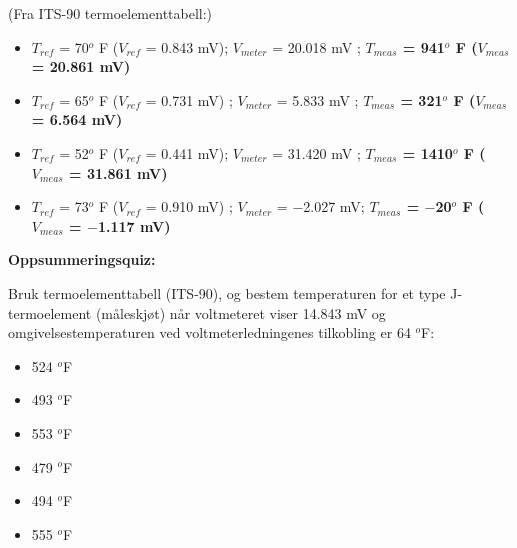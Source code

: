 
(Fra ITS-90 termoelementtabell:)

\begin{itemize}
\item{} $T_{ref}$ = 70$^{o}$ F ($V_{ref}$ = 0.843 mV); $V_{meter}$ = 20.018 mV ; {\bf $T_{meas}$ = 941$^{o}$ F ($V_{meas}$ = 20.861 mV)}
\item{} $T_{ref}$ = 65$^{o}$ F ($V_{ref}$ = 0.731 mV) ; $V_{meter}$ = 5.833 mV ; {\bf $T_{meas}$ = 321$^{o}$ F ($V_{meas}$ = 6.564 mV)}
\item{} $T_{ref}$ = 52$^{o}$ F ($V_{ref}$ = 0.441 mV); $V_{meter}$ = 31.420 mV ; {\bf $T_{meas}$ = 1410$^{o}$ F ($V_{meas}$ = 31.861 mV)}
\item{} $T_{ref}$ = 73$^{o}$ F ($V_{ref}$ = 0.910 mV) ; $V_{meter}$ = $-$2.027 mV; {\bf $T_{meas}$ = $-$20$^{o}$ F ($V_{meas}$ = $-$1.117 mV)}
\end{itemize}




\vfil \eject

\noindent
{\bf Oppsummeringsquiz:}

Bruk termoelementtabell (ITS-90), og bestem temperaturen for et type J-termoelement (måleskjøt) når voltmeteret viser 14.843 mV og omgivelsestemperaturen ved voltmeterledningenes tilkobling er 64 $^{o}$F:

\begin{itemize}
\item{} 524 $^{o}$F
\vskip 5pt
\item{} 493 $^{o}$F
\vskip 5pt
\item{} 553 $^{o}$F
\vskip 5pt
\item{} 479 $^{o}$F
\vskip 5pt
\item{} 494 $^{o}$F
\vskip 5pt
\item{} 555 $^{o}$F
\end{itemize}



